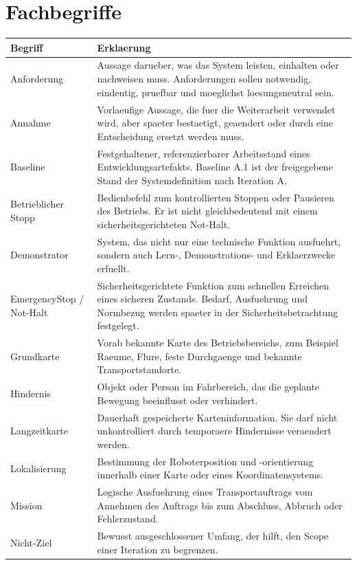 \section{Fachbegriffe}

\begin{longtable}{L{0.24\textwidth} L{0.62\textwidth}}
\toprule
Begriff & Erklaerung \\
\midrule
Anforderung & Aussage darueber, was das System leisten, einhalten oder nachweisen muss. Anforderungen sollen notwendig, eindeutig, pruefbar und moeglichst loesungsneutral sein. \\
Annahme & Vorlaeufige Aussage, die fuer die Weiterarbeit verwendet wird, aber spaeter bestaetigt, geaendert oder durch eine Entscheidung ersetzt werden muss. \\
Baseline & Festgehaltener, referenzierbarer Arbeitsstand eines Entwicklungsartefakts. Baseline A.1 ist der freigegebene Stand der Systemdefinition nach Iteration A. \\
Betrieblicher Stopp & Bedienbefehl zum kontrollierten Stoppen oder Pausieren des Betriebs. Er ist nicht gleichbedeutend mit einem sicherheitsgerichteten Not-Halt. \\
Demonstrator & System, das nicht nur eine technische Funktion ausfuehrt, sondern auch Lern-, Demonstrations- und Erklaerzwecke erfuellt. \\
EmergencyStop / Not-Halt & Sicherheitsgerichtete Funktion zum schnellen Erreichen eines sicheren Zustands. Bedarf, Ausfuehrung und Normbezug werden spaeter in der Sicherheitsbetrachtung festgelegt. \\
Grundkarte & Vorab bekannte Karte des Betriebsbereichs, zum Beispiel Raeume, Flure, feste Durchgaenge und bekannte Transportstandorte. \\
Hindernis & Objekt oder Person im Fahrbereich, das die geplante Bewegung beeinflusst oder verhindert. \\
Langzeitkarte & Dauerhaft gespeicherte Karteninformation. Sie darf nicht unkontrolliert durch temporaere Hindernisse veraendert werden. \\
Lokalisierung & Bestimmung der Roboterposition und -orientierung innerhalb einer Karte oder eines Koordinatensystems. \\
Mission & Logische Ausfuehrung eines Transportauftrags vom Annehmen des Auftrags bis zum Abschluss, Abbruch oder Fehlerzustand. \\
Nicht-Ziel & Bewusst ausgeschlossener Umfang, der hilft, den Scope einer Iteration zu begrenzen. \\

\end{longtable}
